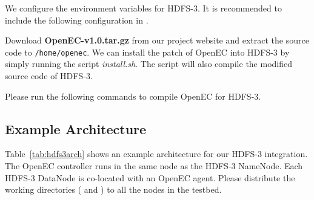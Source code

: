 \documentclass[letterpaper,12pt]{article}
\newcommand{\openec}{{\sf\small OpenEC}\xspace}
\begin{document}
We configure the environment variables for HDFS-3. It is recommended to
include the following configuration in .

\begin{center}
\noindent{}
\end{center}

Download {\bf OpenEC-v1.0.tar.gz} from our project website and extract the
source code to {\tt /home/openec}.  We can install the patch of \openec into
HDFS-3 by simply running the script {\sl install.sh}.  The script will also
compile the modified source code of HDFS-3.

\begin{center}
\noindent{}
\end{center}

Please run the following commands to compile \openec for HDFS-3.

\begin{center}
\noindent{}
\end{center}

\subsection{Example Architecture}

Table~\ref{tab:hdfs3arch} shows an example architecture for our HDFS-3
integration.  The \openec controller runs in the same node as the HDFS-3
NameNode.  Each HDFS-3 DataNode is co-located with an \openec agent. Please
distribute the working directories ( and
) to all the nodes in the testbed. 
\end{document}
